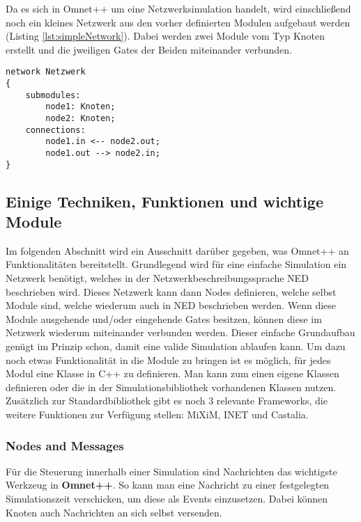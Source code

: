 Da es sich in Omnet++ um eine Netzwerksimulation handelt, wird einschließend noch ein kleines Netzwerk aus den vorher definierten Modulen aufgebaut werden (Listing \ref{lst:simpleNetwork}). Dabei werden zwei Module vom Typ Knoten erstellt und die jweiligen Gates der Beiden miteinander verbunden.
\begin{lstlisting}[language=ned,caption={einfaches Netzwerk},label=lst:simpleNetwork]
network Netzwerk
{
	submodules:
		node1: Knoten;
		node2: Knoten;
	connections:
		node1.in <-- node2.out;
		node1.out --> node2.in;
}
\end{lstlisting}

\subsection{Einige Techniken, Funktionen und wichtige Module}

Im folgenden Abschnitt wird ein Ausschnitt darüber gegeben, was Omnet++ an Funktionalitäten bereitstellt. Grundlegend wird für eine einfache Simulation ein Netzwerk benötigt, welches in der Netzwerkbeschreibungssprache NED beschrieben wird. Dieses Netzwerk kann dann Nodes definieren, welche selbst Module sind, welche wiederum auch in NED beschrieben werden. Wenn diese Module ausgehende und/oder eingehende Gates besitzen, können diese im Netzwerk wiederum miteinander verbunden werden.\newline
Dieser einfache Grundaufbau genügt im Prinzip schon, damit eine valide Simulation ablaufen kann. Um dazu noch etwas Funktionalität in die Module zu bringen ist es möglich, für jedes Modul eine Klasse in C++ zu definieren. Man kann zum einen eigene Klassen definieren oder die in der Simulationsbibliothek vorhandenen Klassen nutzen.\newline
Zusätzlich zur Standardbibliothek gibt es noch 3 relevante Frameworks, die weitere Funktionen zur Verfügung stellen: MiXiM, INET und Castalia.

\subsubsection{Nodes and Messages}\label{para:Nodes and Messages}

Für die Steuerung innerhalb einer Simulation sind Nachrichten das wichtigste Werkzeug in \textbf{Omnet++}. So kann man eine Nachricht zu einer festgelegten Simulationszeit verschicken, um diese als Events einzusetzen. Dabei können Knoten auch Nachrichten an sich selbst versenden.

